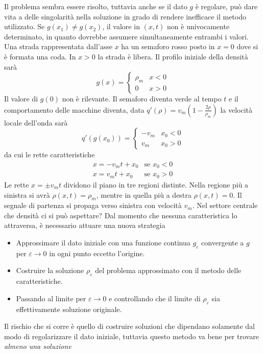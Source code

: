\documentclass[a4paper,12pt, draft]{article}
\theoremstyle{break}
\let\epsilon\varepsilon
\numberwithin{equation}{section}
\begin{document}
Il problema sembra essere risolto, tuttavia anche se il dato \(g\) è regolare, può dare vita a delle singolarità nella soluzione in grado di rendere inefficace il metodo utilizzato. Se \(g(x_1) \not = g(x_2)\), il valore in \((x,t)\) non è univocamente determinato, in quanto dovrebbe assumere simultaneamente entrambi i valori. \\
Una strada rappresentata dall'asse \(x\) ha un semaforo rosso posto in \(x = 0\) dove si è formata una coda. In \(x > 0\) la strada è libera. Il profilo iniziale della densità sarà 
\[
g(x) = \begin{cases}
  \rho_m & x < 0 \\
  0 & x > 0
\end{cases}  
\]
Il valore di \(g(0)\) non è rilevante. Il semaforo diventa verde al tempo \(t\) e il comportamento delle macchine diventa, data \(q'(\rho) = v_m\left(1-\frac{2\rho}{\rho_m}\right)\) la velocità locale dell'onda sarà 
\[
q'(g(x_0)) = \begin{cases}
  -v_m & x_0 < 0 \\
  v_m & x_0 > 0
\end{cases} 
\]
da cui le rette caratteristiche
\begin{eqnarray*}
  x = -v_m t + x_0 & \mbox{se } x_0 < 0 \\
  x = v_m t + x_0 & \mbox{se } x_0 > 0
\end{eqnarray*}
Le rette \(x = \pm v_m t\) dividono il piano in tre regioni distinte. 
Nella regione più a sinistra si avrà \(\rho(x,t) = \rho_m\), mentre in quella più a destra \(\rho(x,t) = 0\). Il segnale di partenza si propaga verso sinistra con velocità \(v_m\). Nel settore centrale che densità ci si può aspettare? Dal momento che nessuna caratteristica lo attraversa, è necessario attuare una nuova strategia
\begin{itemize}
  \item Approssimare il dato iniziale con una funzione continua \(g_{\epsilon}\) convergente a \(g\) per \(\epsilon \to 0\) in ogni punto eccetto l'origine.
  \item Costruire la soluzione \(\rho_{\epsilon}\) del problema approssimato con il metodo delle caratteristiche.
  \item Passando al limite per \(\epsilon \to 0\) e controllando che il limite di \(\rho_{\epsilon}\) sia effettivamente soluzione originale.
\end{itemize}
Il rischio che si corre è quello di costruire soluzioni che dipendano solamente dal modo di regolarizzare il dato iniziale, tuttavia questo metodo va bene per trovare \emph{almeno una soluzione}
\end{document}
